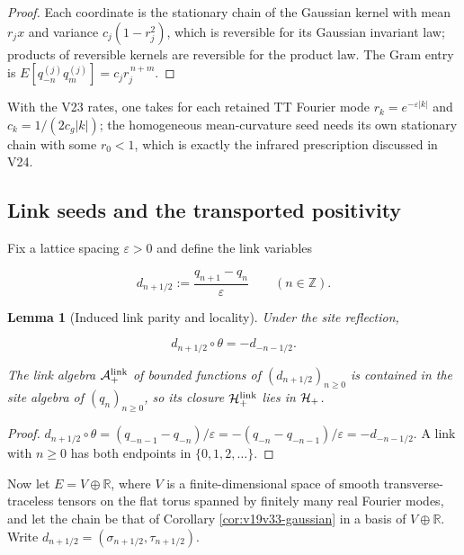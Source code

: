 \documentclass[11pt]{article}
\newtheorem{lemma}[theorem]{Lemma}
\theoremstyle{remark}
\begin{document}
\begin{proof}
Each coordinate is the stationary chain of the Gaussian kernel with
mean \(r_jx\) and variance \(c_j(1-r_j^2)\), which is reversible for its
Gaussian invariant law; products of reversible kernels are reversible for
the product law.  The Gram entry is
\(E[q^{(j)}_{-n}q^{(j)}_m]=c_jr_j^{\,n+m}\).
\end{proof}

With the V23 rates, one takes for each retained TT Fourier mode
\(r_k=e^{-\varepsilon|k|}\) and \(c_k=1/(2c_g|k|)\); the homogeneous
mean-curvature seed needs its own stationary chain with some
\(r_0<1\), which is exactly the infrared prescription discussed in V24.

\subsection{Link seeds and the transported positivity}

Fix a lattice spacing \(\varepsilon>0\) and define the link variables

\[
 d_{n+1/2}:=\frac{q_{n+1}-q_n}{\varepsilon}\qquad(n\in\mathbb Z).
                                                                    \tag{36.4}
\]

\begin{lemma}[Induced link parity and locality]
\label{lem:v19v33-links}
Under the site reflection,

\[
 d_{n+1/2}\circ\theta=-d_{-n-1/2}.                                \tag{36.5}
\]

The link algebra \({\cal A}^{\rm link}_+\) of bounded functions of
\((d_{n+1/2})_{n\geq0}\) is contained in the site algebra of
\((q_n)_{n\geq0}\), so its closure \({\cal H}^{\rm link}_+\) lies in
\({\cal H}_+\).
\end{lemma}

\begin{proof}
\(d_{n+1/2}\circ\theta=(q_{-n-1}-q_{-n})/\varepsilon
=-(q_{-n}-q_{-n-1})/\varepsilon=-d_{-n-1/2}\).  A link with
\(n\geq0\) has both endpoints in \(\{0,1,2,\dots\}\).
\end{proof}

Now let \(E=V\oplus\mathbb R\), where \(V\) is a finite-dimensional space
of smooth transverse-traceless tensors on the flat torus spanned by
finitely many real Fourier modes, and let the chain be that of Corollary
\ref{cor:v19v33-gaussian} in a basis of \(V\oplus\mathbb R\).  Write
\(d_{n+1/2}=(\sigma_{n+1/2},\tau_{n+1/2})\).
\end{document}
